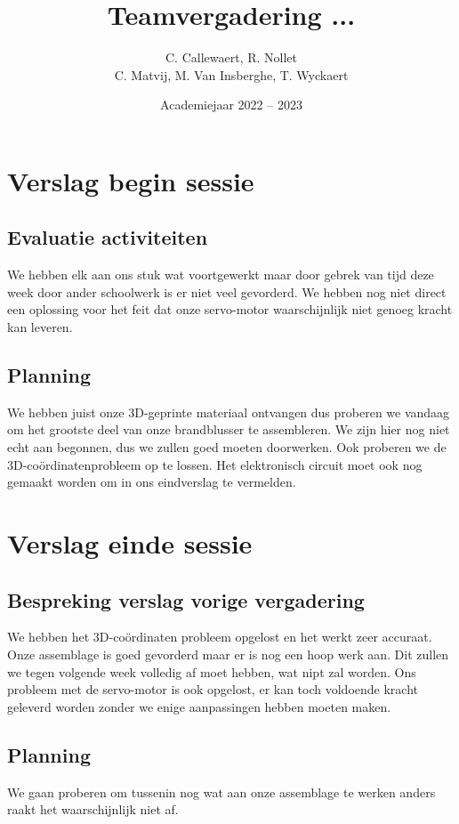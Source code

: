 \documentclass{kulakarticle}
\title{Teamvergadering ...}
\author{C. Callewaert, R. Nollet \\
	C. Matvij, M. Van Insberghe, T. Wyckaert }
\date{Academiejaar 2022 -- 2023}
\begin{document}
	\maketitle
	\section{Verslag begin sessie}
	
	\subsection{Evaluatie activiteiten}
	We hebben elk aan ons stuk wat voortgewerkt maar door gebrek van tijd deze week door ander schoolwerk is er niet veel gevorderd. We hebben nog niet direct een oplossing voor het feit dat onze servo-motor waarschijnlijk niet genoeg kracht kan leveren.

	
	\subsection{Planning}
	
	We hebben juist onze 3D-geprinte materiaal ontvangen dus proberen we vandaag om het grootste deel van onze brandblusser te assembleren. We zijn hier nog  niet echt aan begonnen, dus we zullen goed moeten doorwerken. Ook proberen we de 3D-coördinatenprobleem op te lossen. Het elektronisch circuit moet ook nog gemaakt worden om in ons eindverslag te vermelden.
	
	\section{Verslag einde sessie}
	

	
	\subsection{Bespreking verslag vorige vergadering}
	
		We hebben het 3D-coördinaten probleem opgelost en het werkt zeer accuraat. Onze assemblage is goed gevorderd maar er is nog een hoop werk aan. Dit zullen we tegen volgende week volledig af moet hebben, wat nipt zal worden. Ons probleem met de servo-motor is ook opgelost, er kan toch voldoende kracht geleverd worden zonder we enige aanpassingen hebben moeten maken. 
	\subsection{Planning}
	We gaan proberen om tussenin nog wat aan onze assemblage te werken anders raakt het waarschijnlijk niet af.
\end{document}
